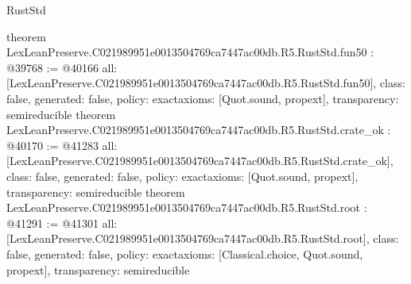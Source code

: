 \begin{lexlean}{RustStd}
\begin{coremodule}
{}
theorem LexLeanPreserve.C021989951e0013504769ca7447ac00db.R5.RustStd.fun50 : @39768 := @40166 {
  all: [LexLeanPreserve.C021989951e0013504769ca7447ac00db.R5.RustStd.fun50],
  class: false,
  generated: false,
  policy: exact{axioms: [Quot.sound, propext]},
  transparency: semireducible
}
theorem LexLeanPreserve.C021989951e0013504769ca7447ac00db.R5.RustStd.crate_ok : @40170 := @41283 {
  all: [LexLeanPreserve.C021989951e0013504769ca7447ac00db.R5.RustStd.crate_ok],
  class: false,
  generated: false,
  policy: exact{axioms: [Quot.sound, propext]},
  transparency: semireducible
}
theorem LexLeanPreserve.C021989951e0013504769ca7447ac00db.R5.RustStd.root : @41291 := @41301 {
  all: [LexLeanPreserve.C021989951e0013504769ca7447ac00db.R5.RustStd.root],
  class: false,
  generated: false,
  policy: exact{axioms: [Classical.choice, Quot.sound, propext]},
  transparency: semireducible
}


\end{coremodule}
\end{lexlean}
